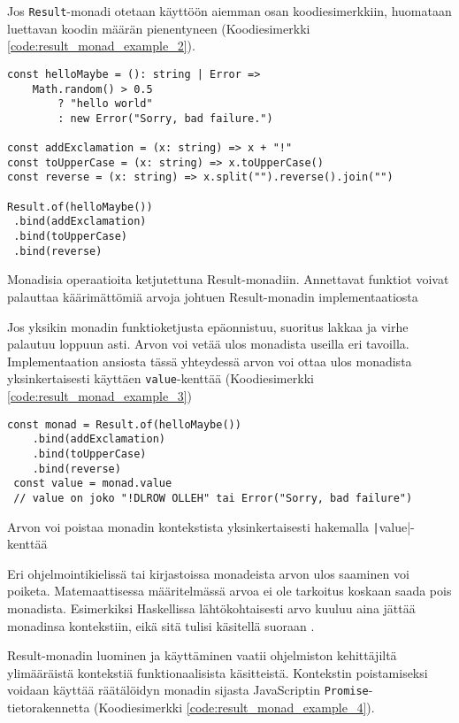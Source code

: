Jos \texttt{Result}-monadi otetaan käyttöön aiemman osan koodiesimerkkiin, huomataan luettavan koodin määrän pienentyneen (Koodiesimerkki \ref{code:result_monad_example_2}).

\begin{code}
    \begin{verbatim}
const helloMaybe = (): string | Error => 
    Math.random() > 0.5 
        ? "hello world" 
        : new Error("Sorry, bad failure.")

const addExclamation = (x: string) => x + "!"
const toUpperCase = (x: string) => x.toUpperCase()
const reverse = (x: string) => x.split("").reverse().join("")

Result.of(helloMaybe())
 .bind(addExclamation)
 .bind(toUpperCase)
 .bind(reverse)
\end{verbatim}
    \caption{Monadisia operaatioita ketjutettuna Result-monadiin. Annettavat funktiot voivat palauttaa käärimättömiä arvoja johtuen Result-monadin implementaatiosta}
    \label{code:result_monad_example_2}
\end{code}

Jos yksikin monadin funktioketjusta epäonnistuu, suoritus lakkaa ja virhe palautuu loppuun asti. Arvon voi vetää ulos monadista useilla eri tavoilla. Implementaation ansiosta tässä yhteydessä arvon voi ottaa ulos monadista yksinkertaisesti käyttäen \texttt{value}-kenttää (Koodiesimerkki \ref{code:result_monad_example_3})


\begin{code}
    \begin{verbatim}
const monad = Result.of(helloMaybe())
    .bind(addExclamation)
    .bind(toUpperCase)
    .bind(reverse)
 const value = monad.value
 // value on joko "!DLROW OLLEH" tai Error("Sorry, bad failure")
\end{verbatim}
    \caption{Arvon voi poistaa monadin kontekstista yksinkertaisesti hakemalla \texttt|value|-kenttää }
    \label{code:result_monad_example_3}
\end{code}

Eri ohjelmointikielissä tai kirjastoissa monadeista arvon ulos saaminen voi poiketa. Matemaattisessa määritelmässä arvoa ei ole tarkoitus koskaan saada pois monadista. Esimerkiksi Haskellissa lähtökohtaisesti arvo kuuluu aina jättää monadinsa kontekstiin, eikä sitä tulisi käsitellä suoraan \cite{haskellallmonad}.

Result-monadin luominen ja käyttäminen vaatii ohjelmiston kehittäjiltä ylimääräistä kontekstiä funktionaalisista käsitteistä. Kontekstin poistamiseksi voidaan käyttää räätälöidyn monadin sijasta JavaScriptin \texttt{Promise}-tietorakennetta (Koodiesimerkki \ref{code:result_monad_example_4}).

